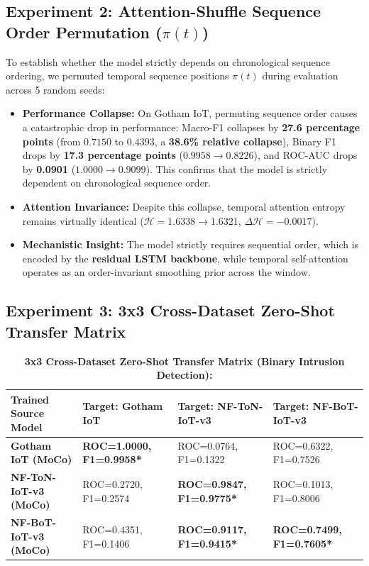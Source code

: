 \documentclass[10pt,a4paper]{article}
\newcommand{\best}[1]{\textbf{\textcolor{bestgreen}{#1*}}}
\begin{document}
\subsection{Experiment 2: Attention-Shuffle Sequence Order Permutation ($\pi(t)$)}
To establish whether the model strictly depends on chronological sequence ordering, we permuted temporal sequence positions $\pi(t)$ during evaluation across 5 random seeds:
\begin{itemize}[leftmargin=*]
    \item \textbf{Performance Collapse:} On Gotham IoT, permuting sequence order causes a catastrophic drop in performance: Macro-F1 collapses by \textbf{27.6 percentage points} (from $0.7150$ to $0.4393$, a \textbf{38.6\% relative collapse}), Binary F1 drops by \textbf{17.3 percentage points} ($0.9958 \to 0.8226$), and ROC-AUC drops by \textbf{0.0901} ($1.0000 \to 0.9099$). This confirms that the model is strictly dependent on chronological sequence order.
    \item \textbf{Attention Invariance:} Despite this collapse, temporal attention entropy remains virtually identical ($\mathcal{H} = 1.6338 \to 1.6321$, $\Delta\mathcal{H} = -0.0017$).
    \item \textbf{Mechanistic Insight:} The model strictly requires sequential order, which is encoded by the \textbf{residual LSTM backbone}, while temporal self-attention operates as an order-invariant smoothing prior across the window.
\end{itemize}

\subsection{Experiment 3: 3x3 Cross-Dataset Zero-Shot Transfer Matrix}
\begin{table}[htbp]
\centering
\small
\caption{\textbf{3x3 Cross-Dataset Zero-Shot Transfer Matrix (Binary Intrusion Detection):}}
\begin{tabularx}{\textwidth}{lXXX}
\toprule
\textbf{Trained Source Model} & \textbf{Target: Gotham IoT} & \textbf{Target: NF-ToN-IoT-v3} & \textbf{Target: NF-BoT-IoT-v3} \\
\midrule
\textbf{Gotham IoT (MoCo)} & \best{ROC=1.0000, F1=0.9958} & ROC=0.0764, F1=0.1322 & ROC=0.6322, F1=0.7526 \\
\textbf{NF-ToN-IoT-v3 (MoCo)} & ROC=0.2720, F1=0.2574 & \best{ROC=0.9847, F1=0.9775} & ROC=0.1013, F1=0.8006 \\
\textbf{NF-BoT-IoT-v3 (MoCo)} & ROC=0.4351, F1=0.1406 & \best{ROC=0.9117, F1=0.9415} & \best{ROC=0.7499, F1=0.7605} \\
\bottomrule
\end{tabularx}
\label{tab:transfer}
\end{table}
\end{document}
